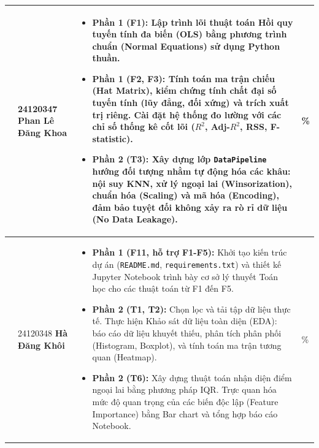 \begin{longtable}{|p{}|p{}|>{\linespread{1.3}\selectfont\arraybackslash}p{}|p{}|}
    \centering 2 & 
    24120347 \newline \textbf{Phan Lê Đăng Khoa} & 
    \vspace{-0.4cm}
    \begin{itemize}[itemsep=0.15cm, topsep=0cm, partopsep=0cm]
        \item \textbf{Phần 1 (F1):} Lập trình lõi thuật toán Hồi quy tuyến tính đa biến (OLS) bằng phương trình chuẩn (Normal Equations) sử dụng Python thuần.
        \item \textbf{Phần 1 (F2, F3):} Tính toán ma trận chiếu (Hat Matrix), kiểm chứng tính chất đại số tuyến tính (lũy đẳng, đối xứng) và trích xuất trị riêng. Cài đặt hệ thống đo lường với các chỉ số thống kê cốt lõi ($R^2$, Adj-$R^2$, RSS, F-statistic).
        \item \textbf{Phần 2 (T3):} Xây dựng lớp \texttt{DataPipeline} hướng đối tượng nhằm tự động hóa các khâu: nội suy KNN, xử lý ngoại lai (Winsorization), chuẩn hóa (Scaling) và mã hóa (Encoding), đảm bảo tuyệt đối không xảy ra rò rỉ dữ liệu (No Data Leakage).
    \end{itemize} \vspace{-0.2cm} & 
    \centering 100\% \tabularnewline \hline
    
    \centering 3 & 
    24120348 \newline \textbf{Hà Đăng Khôi} & 
    \vspace{-0.4cm}
    \begin{itemize}[itemsep=0.15cm, topsep=0cm, partopsep=0cm]
        \item \textbf{Phần 1 (F11, hỗ trợ F1-F5):} Khởi tạo kiến trúc dự án (\texttt{README.md}, \texttt{requirements.txt}) và thiết kế Jupyter Notebook trình bày cơ sở lý thuyết Toán học cho các thuật toán từ F1 đến F5.
        \item \textbf{Phần 2 (T1, T2):} Chọn lọc và tải tập dữ liệu thực tế. Thực hiện Khảo sát dữ liệu toàn diện (EDA): báo cáo dữ liệu khuyết thiếu, phân tích phân phối (Histogram, Boxplot), và tính toán ma trận tương quan (Heatmap).
        \item \textbf{Phần 2 (T6):} Xây dựng thuật toán nhận diện điểm ngoại lai bằng phương pháp IQR. Trực quan hóa mức độ quan trọng của các biến độc lập (Feature Importance) bằng Bar chart và tổng hợp báo cáo Notebook.
    \end{itemize} \vspace{-0.2cm} & 
    \centering 100\% \tabularnewline \hline


\end{longtable}
